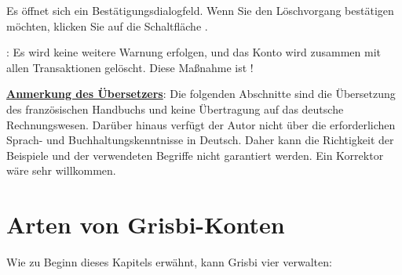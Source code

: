 Es öffnet sich ein Bestätigungsdialogfeld. Wenn Sie den Löschvorgang bestätigen möchten, klicken Sie auf die Schaltfläche .

\Attention{}: Es wird keine weitere Warnung erfolgen, und das Konto wird zusammen mit allen Transaktionen gelöscht. Diese Maßnahme ist !
\newline

\noindent
\underline{\textbf{Anmerkung des Übersetzers}}: Die folgenden Abschnitte sind die Übersetzung des französischen Handbuchs und keine Übertragung auf das deutsche Rechnungswesen. Darüber hinaus verfügt der Autor nicht über die erforderlichen Sprach- und Buchhaltungskenntnisse in Deutsch. Daher kann die Richtigkeit der Beispiele und der verwendeten Begriffe nicht garantiert werden.
\newline
Ein Korrektor wäre sehr willkommen.


\section{Arten von Grisbi-Konten\label{accounts-type}}%

Wie zu Beginn dieses Kapitels erwähnt, kann Grisbi vier  verwalten:


